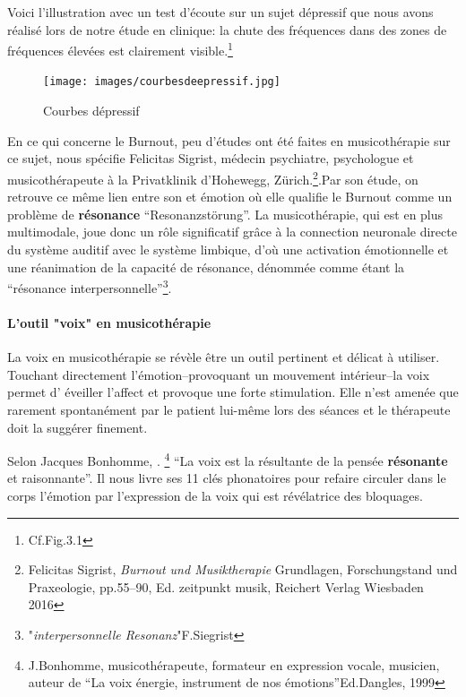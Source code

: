 Voici l'illustration avec un test
d'écoute sur un sujet dépressif que nous avons réalisé lors de notre
étude en clinique: la
chute des fréquences dans des zones de fréquences élevées est
clairement visible.\footnote{Cf.Fig.3.1}
 \begin{figure}
	\centering
	\texttt{[image: images/courbesdeepressif.jpg]}
	\caption{Courbes dépressif}
	\label{fig:courbes du dépressif}
      \end{figure}


      En ce qui concerne le Burnout, peu d'études ont été faites en musicothérapie
sur ce sujet, nous spécifie Felicitas Sigrist, médecin
psychiatre, psychologue et musicothérapeute à la Privatklinik
d'Hohewegg, Zürich.\autocite[pp.55--90,``Burnout und 
		Musiktherapie''] {sigrist_burnout_2016}\footnote{Felicitas Sigrist,  
\textit{Burnout und 
		Musiktherapie} Grundlagen, Forschungstand und Praxeologie, pp.55--90, Ed. 
	zeitpunkt musik, Reichert Verlag Wiesbaden 2016}.Par son étude, on retrouve ce 
	même lien entre son et 
émotion où elle qualifie le Burnout comme un problème de \textbf{résonance} ``Resonanzstörung''. La 
musicothérapie, qui est en plus multimodale, joue donc un rôle significatif grâce à la 
connection 
neuronale directe du système auditif avec le système limbique, d'où une activation 
émotionnelle et une  réanimation de  la capacité de résonance, dénommée comme 
étant la 
``résonance interpersonnelle''\footnote{"\textit{interpersonnelle Resonanz}"F.Siegrist}.

\paragraph{L'outil "voix" en musicothérapie}

La voix en musicothérapie se révèle être un outil pertinent et délicat
à utiliser. Touchant 
directement 
l'émotion--provoquant un mouvement intérieur--la voix permet d'
éveiller l'affect
et provoque une forte stimulation. Elle n'est amenée que rarement
spontanément par le patient lui-même lors des séances et le thérapeute doit la suggérer
finement.

Selon Jacques Bonhomme, .\autocite[pp.55--90,``Burnout und 
		Musiktherapie''] {sigrist_burnout_2016} \footnote{J.Bonhomme, musicothérapeute, formateur 
  	en expression vocale, musicien, auteur de ``La voix énergie,
        instrument de nos émotions''Ed.Dangles, 1999} ``La voix est la
      résultante de la pensée \textbf{résonante}  et raisonnante''.
      Il nous livre ses 11 clés phonatoires pour refaire circuler dans
      le corps 
      l'émotion par l'expression de la voix qui est révélatrice des bloquages.

